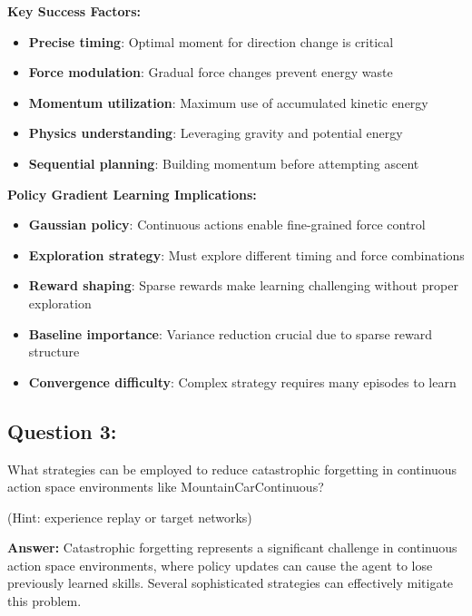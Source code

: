 \documentclass[12pt]{article}
\begin{document}
{{{\textbf{Key Success Factors:}
\begin{itemize}
    \item \textbf{Precise timing}: Optimal moment for direction change is critical
    \item \textbf{Force modulation}: Gradual force changes prevent energy waste
    \item \textbf{Momentum utilization}: Maximum use of accumulated kinetic energy
    \item \textbf{Physics understanding}: Leveraging gravity and potential energy
    \item \textbf{Sequential planning}: Building momentum before attempting ascent
\end{itemize}

\textbf{Policy Gradient Learning Implications:}
\begin{itemize}
    \item \textbf{Gaussian policy}: Continuous actions enable fine-grained force control
    \item \textbf{Exploration strategy}: Must explore different timing and force combinations
    \item \textbf{Reward shaping}: Sparse rewards make learning challenging without proper exploration
    \item \textbf{Baseline importance}: Variance reduction crucial due to sparse reward structure
    \item \textbf{Convergence difficulty}: Complex strategy requires many episodes to learn
\end{itemize}

\subsection{Question 3:}

What strategies can be employed to reduce catastrophic forgetting in continuous action space environments like MountainCarContinuous?

(Hint: experience replay or target networks)
\vspace*{0.3cm}

\textbf{Answer:} Catastrophic forgetting represents a significant challenge in continuous action space environments, where policy updates can cause the agent to lose previously learned skills. Several sophisticated strategies can effectively mitigate this problem.

}}}
\end{document}
